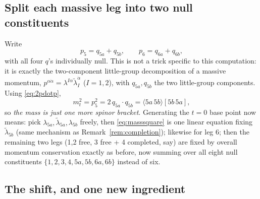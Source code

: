 \documentclass[11pt]{article}
\newcommand{\ang}[2]{\langle #1\,#2\rangle}
\newcommand{\sq}[2]{[#1\,#2]}
\newcommand{\lam}{\lambda}
\newcommand{\lt}{\tilde\lambda}
\theoremstyle{definition}
\begin{document}
\subsection{Split each massive leg into two null constituents}

Write
\begin{equation}
p_5 = q_{5a}+q_{5b}, \qquad p_6 = q_{6a}+q_{6b},
\end{equation}
with all four $q$'s individually null. This is not a trick specific to this computation: it is
exactly the two-component little-group decomposition of a massive momentum,
$p^{\alpha\dot\alpha}=\lam^{I\alpha}\lt_I^{\dot\alpha}$ ($I=1,2$), with $q_{5a},q_{5b}$ the two
little-group components. Using \eqref{eq:2pdotp},
\begin{equation}
m_t^2 = p_5^2 = 2\,q_{5a}\!\cdot\! q_{5b} = \ang{5a}{5b}\sq{5b}{5a}, \label{eq:masssquare}
\end{equation}
so \emph{the mass is just one more spinor bracket}. Generating the $t=0$ base point now means:
pick $\lam_{5a},\lt_{5a},\lam_{5b}$ freely, then \eqref{eq:masssquare} is one linear equation
fixing $\lt_{5b}$ (same mechanism as Remark~\ref{rem:completion}); likewise for leg 6; then the
remaining two legs (1,2 free, 3 free + 4 completed, say) are fixed by overall momentum
conservation exactly as before, now summing over all eight null constituents
$\{1,2,3,4,5a,5b,6a,6b\}$ instead of six.

\subsection{The shift, and one new ingredient}
\end{document}
